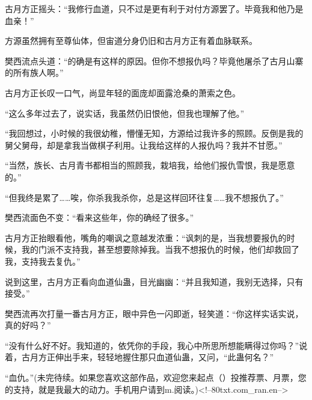 \begin{this_body}
古月方正摇头：“我修行血道，只不过是更有利于对付方源罢了。毕竟我和他乃是血亲！”

方源虽然拥有至尊仙体，但宙道分身仍旧和古月方正有着血脉联系。

樊西流点头道：“的确是有这样的原因。但你不想报仇吗？毕竟他屠杀了古月山寨的所有族人啊。”

古月方正长叹一口气，尚显年轻的面庞却面露沧桑的萧索之色。

“这么多年过去了，说实话，我虽然仍旧恨他，但我也理解了他。”

“我回想过，小时候的我很幼稚，懵懂无知，方源给过我许多的照顾。反倒是我的舅父舅母，却是拿我当做棋子利用。让我给这样的人报仇吗？我并不甘愿。”

“当然，族长、古月青书都相当的照顾我，栽培我，给他们报仇雪恨，我是愿意的。”

“但我终是累了……唉，你杀我我杀你，总是这样回环往复……我不想报仇了。”

樊西流面色不变：“看来这些年，你的确经了很多。”

古月方正抬眼看他，嘴角的嘲讽之意越发浓重：“讽刺的是，当我想要报仇的时候，我的门派不支持我，甚至想要除掉我。当我不想报仇的时候，他们却救回了我，支持我去复仇。”

说到这里，古月方正看向血道仙蛊，目光幽幽：“并且我知道，我别无选择，只有接受。”

樊西流再次打量一番古月方正，眼中异色一闪即逝，轻笑道：“你这样实话实说，真的好吗？”

“没有什么好不好。我知道的，依凭你的手段，我心中所思所想能瞒得过你吗？”说着，古月方正伸出手来，轻轻地握住那只血道仙蛊，又问，“此蛊何名？”

“血仇。”(未完待续。如果您喜欢这部作品，欢迎您来起点（）投推荐票、月票，您的支持，就是我最大的动力。手机用户请到m.阅读。)<!--80txt.com\_ran.en-->

\end{this_body}

